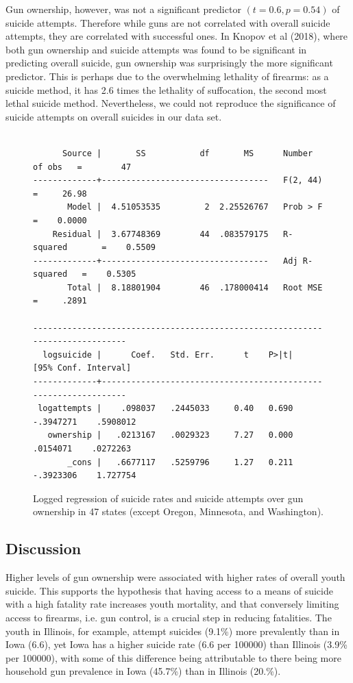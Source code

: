 \documentclass{article}
\begin{document}
Gun ownership, however, was not a significant predictor $(t = 0.6, p = 0.54)$ of suicide attempts. Therefore while guns are not correlated with overall suicide attempts, they are correlated with successful ones. In Knopov et al (2018), where both gun ownership and suicide attempts was found to be significant in predicting overall suicide, gun ownership was surprisingly the more significant predictor. This is perhaps due to the overwhelming lethality of firearms: as a suicide method, it has 2.6 times the lethality of suffocation,  the second most lethal suicide method. Nevertheless, we could not reproduce the significance of suicide attempts on overall suicides in our data set.\\
\begin{figure}[h]
\centering	
\begin{verbatim}
	
      Source |       SS           df       MS      Number of obs   =        47
-------------+----------------------------------   F(2, 44)        =     26.98
       Model |  4.51053535         2  2.25526767   Prob > F        =    0.0000
    Residual |  3.67748369        44  .083579175   R-squared       =    0.5509
-------------+----------------------------------   Adj R-squared   =    0.5305
       Total |  8.18801904        46  .178000414   Root MSE        =     .2891

------------------------------------------------------------------------------
  logsuicide |      Coef.   Std. Err.      t    P>|t|     [95% Conf. Interval]
-------------+----------------------------------------------------------------
 logattempts |    .098037   .2445033     0.40   0.690    -.3947271    .5908012
   ownership |   .0213167   .0029323     7.27   0.000     .0154071    .0272263
       _cons |   .6677117   .5259796     1.27   0.211    -.3923306    1.727754
\end{verbatim}
\caption{Logged regression of suicide rates and suicide attempts over gun ownership in 47 states (except Oregon, Minnesota, and Washington).}
\end{figure}

\subsection*{Discussion}


Higher levels of gun ownership were associated with higher rates of overall youth suicide. This supports the hypothesis that having access to a means of suicide with a high fatality rate increases youth mortality, and that conversely limiting access to firearms, i.e. gun control, is a crucial step in reducing fatalities. The youth in Illinois, for example, attempt suicides (9.1\%) more prevalently than in Iowa (6.6), yet Iowa has a higher suicide rate (6.6 per 100000) than Illinois (3.9\% per 100000), with some of this difference being attributable to there being more household gun prevalence in Iowa (45.7\%) than in Illinois (20.\%).\\
\end{document}
